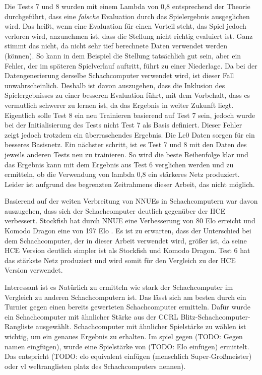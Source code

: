 Die Tests 7 und 8 wurden mit einem Lambda von 0,8 entsprechend der Theorie durchgeführt, dass eine \emph{falsche} Evaluation durch das Spielergebnis ausgeglichen wird. Das heißt, wenn eine Evaluation für einen Vorteil steht, das Spiel jedoch verloren wird, anzunehmen ist, dass die Stellung nicht richtig evaluiert ist. Ganz stimmt das nicht, da nicht sehr tief berechnete Daten verwendet werden (können). So kann in dem Beispiel die Stellung tatsächlich gut sein, aber ein Fehler, der im späteren Spielverlauf auftritt, führt zu einer Niederlage. Da bei der Datengenerierung derselbe Schachcomputer verwendet wird, ist dieser Fall unwahrscheinlich. Deshalb ist davon auszugehen, dass die Inklusion des Spielergebnisses zu einer besseren Evaluation führt, mit dem Vorbehalt, dass es vermutlich schwerer zu lernen ist, da das Ergebnis in weiter Zukunft liegt. Eigentlich solle Test 8 ein neu Trainieren basierend auf Test 7 sein, jedoch wurde bei der Initialisierung des Tests nicht Test 7 als Basis definiert. Dieser Fehler zeigt jedoch trotzdem ein überraschendes Ergebnis. Die \ac{Lc0} Daten sorgen für ein besseres Basisnetz. Ein nächster schritt, ist es Test 7 und 8 mit den Daten des jeweils anderen Tests neu zu trainieren. So wird die beste Reihenfolge klar und das Ergebnis kann mit dem Ergebnis aus Test 6 verglichen werden und zu ermitteln, ob die Verwendung von lambda 0,8 ein stärkeres Netz produziert. Leider ist aufgrund des begrenzten Zeitrahmens dieser Arbeit, das nicht möglich.

Basierend auf der weiten Verbreitung von \acp{NNUE} in Schachcomputern war davon auszugehen, dass sich der Schachcomputer deutlich gegenüber der \ac{HCE} verbessert. Stockfish hat durch \ac{NNUE} eine Verbesserung von 80 Elo erreicht und Komodo Dragon eine von 197 Elo \cite{StockfishIntroducingNNUE, KomodoDragon}. Es ist zu erwarten, dass der Unterschied bei dem Schachcomputer, der in dieser Arbeit verwendet wird, größer ist, da seine \ac{HCE} Version deutlich simpler ist als Stockfish und Komodo Dragon. Test 6 hat das stärkste Netz produziert und wird somit für den Vergleich zu der \ac{HCE} Version verwendet.

Interessant ist es Natürlich zu ermitteln wie stark der Schachcomputer im Vergleich zu anderen Schachcomputern ist. Das lässt sich am besten durch ein Turnier gegen einen bereits gewerteten Schachcomputer ermitteln. Dafür wurde ein Schachcomputer mit ähnlicher Stärke aus der \ac{CCRL} \cite{CCRL} Blitz-Schachcomputer-Rangliste ausgewählt. Schachcomputer mit ähnlicher Spielstärke zu wählen ist wichtig, um ein genaues Ergebnis zu erhalten. Im spiel gegen (TODO: Gegen namen eingfügen), wurde eine Spielstärke von (TODO: Elo einfügen) ermittelt. Das entspricht (TODO: elo equivalent einfügen (menschlich \zb{} Super-Großmeister) oder vl weltranglisten platz des Schachcomputers nennen).


